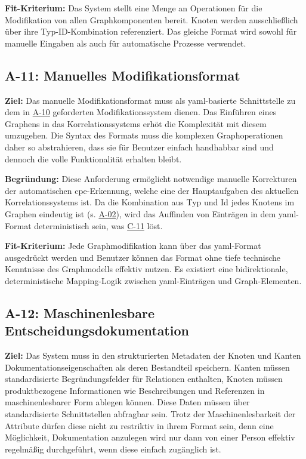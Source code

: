 \textbf{Fit-Kriterium:}
Das System stellt eine Menge an Operationen für die Modifikation von allen Graphkomponenten bereit.
Knoten werden ausschließlich über ihre Typ-ID-Kombination referenziert.
Das gleiche Format wird sowohl für manuelle Eingaben als auch für automatische Prozesse verwendet.

\subsection{A-11: Manuelles Modifikationsformat}\label{subsec:req-manual-format-modification-for-real}

\textbf{Ziel:}
Das manuelle Modifikationsformat muss als \acrshort{yaml}-basierte Schnittstelle zu dem in \hyperref[subsec:req-manual-format-modification]{A-10} geforderten Modifikationssystem dienen.
Das Einführen eines Graphens in das Korrelationssystems erhöt die Komplexität mit diesem umzugehen.
Die Syntax des Formats muss die komplexen Graphoperationen daher so abstrahieren, dass sie für Benutzer einfach handhabbar sind und dennoch die volle Funktionalität erhalten bleibt.

\textbf{Begründung:}
Diese Anforderung ermöglicht notwendige manuelle Korrekturen der automatischen \acrshort{cpe}-Erkennung, welche eine der Hauptaufgaben des aktuellen Korrelationssystems ist.
Da die Kombination aus Typ und Id jedes Knotens im Graphen eindeutig ist (s. \hyperref[subsec:req-node-id-type]{A-02}), wird das Auffinden von Einträgen in dem \acrshort{yaml}-Format deterministisch sein, was \hyperref[subsec:c-11-finding-yaml-entries]{C-11} löst.

\textbf{Fit-Kriterium:}
Jede Graphmodifikation kann über das \acrshort{yaml}-Format ausgedrückt werden und Benutzer können das Format ohne tiefe technische Kenntnisse des Graphmodells effektiv nutzen.
Es existiert eine bidirektionale, deterministische Mapping-Logik zwischen \acrshort{yaml}-Einträgen und Graph-Elementen.

\subsection{A-12: Maschinenlesbare Entscheidungsdokumentation}\label{subsec:req-reason-format}

\textbf{Ziel:}
Das System muss in den strukturierten Metadaten der Knoten und Kanten Dokumentationseigenschaften als deren Bestandteil speichern.
Kanten müssen standardisierte Begründungsfelder für Relationen enthalten, Knoten müssen produktbezogene Informationen wie Beschreibungen und Referenzen in maschinenlesbarer Form ablegen können.
Diese Daten müssen über standardisierte Schnittstellen abfragbar sein.
Trotz der Maschinenlesbarkeit der Attribute dürfen diese nicht zu restriktiv in ihrem Format sein, denn eine Möglichkeit, Dokumentation anzulegen wird nur dann von einer Person effektiv regelmäßig durchgeführt, wenn diese einfach zugänglich ist.

